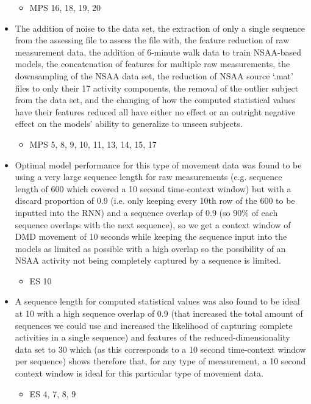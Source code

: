 \documentclass[12pt,twoside]{report}
\begin{document}
\begin{itemize}
	\begin{itemize}
		\item MPS 16, 18, 19, 20
	\end{itemize}
	\item The addition of noise to the data set, the extraction of only a single sequence from the assessing file to assess the file with, the feature reduction of raw measurement data, the addition of 6-minute walk data to train NSAA-based models, the concatenation of features for multiple raw measurements, the downsampling of the NSAA data set, the reduction of NSAA source ‘.mat’ files to only their 17 activity components, the removal of the outlier subject from the data set, and the changing of how the computed statistical values have their features reduced all have either no effect or an outright negative effect on the models’ ability to generalize to unseen subjects.
	\begin{itemize}
		\item MPS 5, 8, 9, 10, 11, 13, 14, 15, 17
	\end{itemize}
	\item Optimal model performance for this type of movement data was found to be using a very large sequence length for raw measurements (e.g. sequence length of 600 which covered a 10 second time-context window) but with a discard proportion of 0.9 (i.e. only keeping every 10th row of the 600 to be inputted into the RNN) and a sequence overlap of 0.9 (so 90\% of each sequence overlaps with the next sequence), so we get a context window of DMD movement of 10 seconds while keeping the sequence input into the models as limited as possible with a high overlap so the possibility of an NSAA activity not being completely captured by a sequence is limited.
	\begin{itemize}
		\item ES 10
	\end{itemize}
	\item A sequence length for computed statistical values was also found to be ideal at 10 with a high sequence overlap of 0.9 (that increased the total amount of sequences we could use and increased the likelihood of capturing complete activities in a single sequence) and features of the reduced-dimensionality data set to 30 which (as this corresponds to a 10 second time-context window per sequence) shows therefore that, for any type of measurement, a 10 second context window is ideal for this particular type of movement data.
	\begin{itemize}
		\item ES 4, 7, 8, 9

\end{itemize}
\end{itemize}
\end{document}
